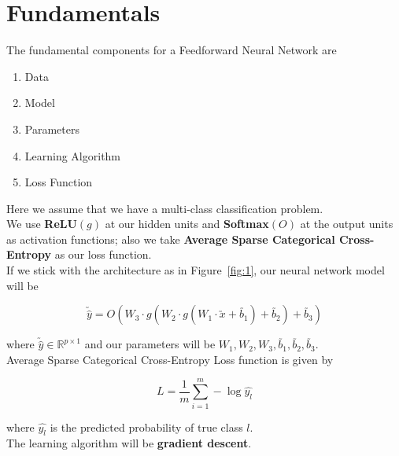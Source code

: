 \documentclass[11pt, a4paper]{article}
\begin{document}
\section{Fundamentals}

The fundamental components for a Feedforward Neural Network are

\begin{enumerate}[(1)]

\item Data

\item Model

\item Parameters

\item Learning Algorithm

\item Loss Function

\end{enumerate}

Here we assume that we have a multi-class classification problem. \\

\leftpointright \hspace{0.1cm} We use \textbf{ReLU}$(g)$ at our hidden units and \textbf{Softmax}$(O)$ at the output units as activation functions; also we take \textbf{Average Sparse Categorical Cross-Entropy} as our loss function. \\

\leftpointright \hspace{0.1cm} If we stick with the architecture as in Figure~\ref{fig:1}, our neural network model will be

$$ \utilde{\hat{y}} = O(W_3 \cdot g(W_2 \cdot g(W_1 \cdot \utilde{x} + \utilde{b_1}) + \utilde{b_2}) + \utilde{b_3})$$

where $\utilde{\hat{y}} \in \mathbb{R}^{p \times 1}$ and our parameters will be $W_1, W_2, W_3, \utilde{b_1}, \utilde{b_2}, \utilde{b_3}$. \\

\leftpointright \hspace{0.1cm} Average Sparse Categorical Cross-Entropy Loss function is given by

$$L = \dfrac{1}{m} \sum \limits_{i = 1}^{m} - \log \hat{y_l}$$

where $\hat{y_l}$ is the predicted probability of true class $l$. \\

\leftpointright \hspace{0.1cm} The learning algorithm will be \textbf{gradient descent}. \\
\end{document}
